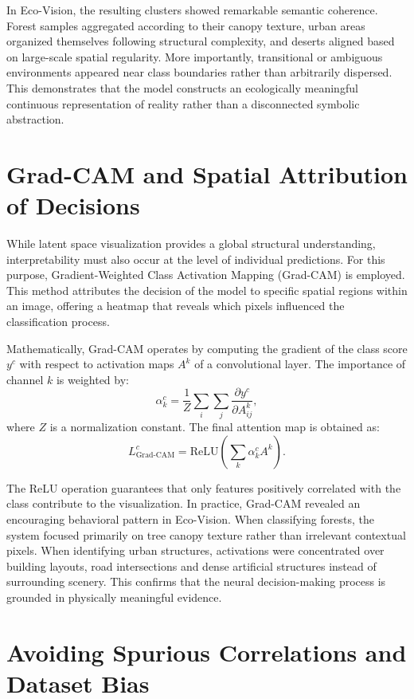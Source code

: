 \documentclass[12pt,a4paper]{report}
\begin{document}
In Eco-Vision, the resulting clusters showed remarkable semantic coherence. Forest samples aggregated according to their canopy texture, urban areas organized themselves following structural complexity, and deserts aligned based on large-scale spatial regularity. More importantly, transitional or ambiguous environments appeared near class boundaries rather than arbitrarily dispersed. This demonstrates that the model constructs an ecologically meaningful continuous representation of reality rather than a disconnected symbolic abstraction.

\section{Grad-CAM and Spatial Attribution of Decisions}

While latent space visualization provides a global structural understanding, interpretability must also occur at the level of individual predictions. For this purpose, Gradient-Weighted Class Activation Mapping (Grad-CAM) is employed. This method attributes the decision of the model to specific spatial regions within an image, offering a heatmap that reveals which pixels influenced the classification process.

Mathematically, Grad-CAM operates by computing the gradient of the class score \( y^c \) with respect to activation maps \( A^k \) of a convolutional layer. The importance of channel \(k\) is weighted by:
\[
\alpha_k^c = \frac{1}{Z} \sum_i \sum_j \frac{\partial y^c}{\partial A_{ij}^k},
\]
where \(Z\) is a normalization constant. The final attention map is obtained as:
\[
L_{\text{Grad-CAM}}^c = \text{ReLU}\left(\sum_k \alpha_k^c A^k\right).
\]

The ReLU operation guarantees that only features positively correlated with the class contribute to the visualization. In practice, Grad-CAM revealed an encouraging behavioral pattern in Eco-Vision. When classifying forests, the system focused primarily on tree canopy texture rather than irrelevant contextual pixels. When identifying urban structures, activations were concentrated over building layouts, road intersections and dense artificial structures instead of surrounding scenery. This confirms that the neural decision-making process is grounded in physically meaningful evidence.

\section{Avoiding Spurious Correlations and Dataset Bias}
\end{document}
